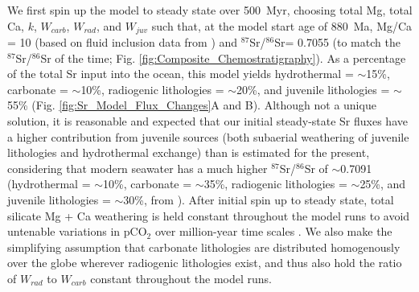 \documentclass[11pt,letterpaper]{article}
\newcommand{\SrSr}{$^{87}$Sr/$^{86}$Sr\xspace}
\begin{document}
We first spin up the model to steady state over 500~Myr, choosing total Mg, total Ca, $k$, $W_{carb}$, $W_{rad}$, and $W_{juv}$ such that, at the model start age of 880~Ma, Mg/Ca = 10 (based on fluid inclusion data from \citealp{Spear2014a}) and \SrSr = 0.7055 (to match the \SrSr of the time; Fig. \ref{fig:Composite_Chemostratigraphy}). As a percentage of the total Sr input into the ocean, this model yields hydrothermal = $\sim$15\%, carbonate = $\sim$10\%, radiogenic lithologies = $\sim$20\%, and juvenile lithologies = $\sim$55\% (Fig. \ref{fig:Sr_Model_Flux_Changes}A and B). Although not a unique solution, it is reasonable and expected that our initial steady-state Sr fluxes have a higher contribution from juvenile sources (both subaerial weathering of juvenile lithologies and hydrothermal exchange) than is estimated for the present, considering that modern seawater has a much higher \SrSr of $\sim$0.7091 (hydrothermal = $\sim$10\%, carbonate = $\sim$35\%, radiogenic lithologies = $\sim$25\%, and juvenile lithologies = $\sim$30\%, from \citealp{Allegre2010a}). After initial spin up to steady state, total silicate Mg + Ca weathering is held constant throughout the model runs to avoid untenable variations in pCO$_{2}$ over million-year time scales \citep{Berner1997a}. We also make the simplifying assumption that carbonate lithologies are distributed homogenously over the globe wherever radiogenic lithologies exist, and thus also hold the ratio of $W_{rad}$ to $W_{carb}$ constant throughout the model runs.
\end{document}
